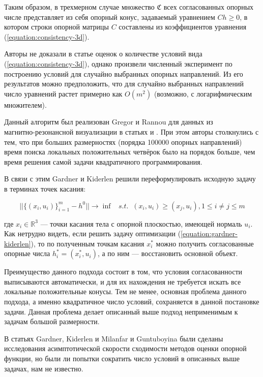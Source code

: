 \documentclass[a4paper, 10pt]{article}
\theoremstyle{definition}
\theoremstyle{plain}
\theoremstyle{plain}
\begin{document}
Таким образом, в трехмерном случае множество $\mathfrak{C}$ всех согласованных
опорных числе представляет из себя опорный конус, задаваемый уравнением
$C h \geq 0$, в котором строки опорной матрицы $C$ составлены из коэффициентов
уравнения (\ref{equation:consistency-3d}).

Авторы не доказали в статье оценок о количестве условий вида
(\ref{equation:consistency-3d}), однако произвели численный эксперимент по
построению условий для случайно выбранных опорных направлений. Из его
результатов можно предположить, что для случайно выбранных направлений число
уравнений растет примерно как $O(m^{2})$ (возможно, с логарифмическим
множителем).

Данный алгоритм был реализован Gregor и Rannou для данных из \\
магнитно-резонансной визуализации в статьях \cite{GregorRannou2001} и
\cite{GregorRannou2002}. При этом авторы столкнулись с тем, что при больших
размерностях (порядка 100000 опорных направлений) время поиска локальных
положительных четвёрок было на порядок больше, чем время решения самой задачи
квадратичного программирования.

В связи с этим Gardner и Kiderlen \cite{GardnerKiderlen} решили
переформулировать исходную задачу в терминах точек касания:

\begin{equation}
\label{equation:gardner-kiderlen}
 ||\{(x_{i}, u_{i})\}_{i = 1}^{m} - h^{0}|| \to \inf \;\;\; s. t. \;\;
 (x_{i}, u_{i}) \geq (x_{j}, u_{i}), 1 \leq i \neq j \leq m
\end{equation}

где $x_{i} \in \mathbb{R}^{3}$ --- точки касания тела с опорной плоскостью,
имеющей нормаль $u_{i}$. Как нетрудно видеть, если решить задачу оптимизации
(\ref{equation:gardner-kiderlen}), то по полученным точкам касания $x^{*}_{i}$
можно получить согласованные опорные числа $h^{*}_{i} = (x^{*}_{i}, u_{i})$, а
по ним --- восстановить основной объект.

Преимущество данного подхода состоит в том, что условия согласованности
выписываются автоматически, и для их нахождения не требуется искать все
локальные положительные конусы. Тем не менее, основная проблема данного подхода,
а именно квадратичное число условий, сохраняется в данной постановке задачи.
Данная проблема делает описанный выше подход неприменимым к задачам большой
размерности.

В статьях Gardner, Kiderlen и Milanfar \cite{GardnerKiderlenMilanfar} и
Guntuboyina \cite{Guntuboyina} были сделаны исследования асимптотической
скорости сходимости методов оценки опорной функции, но были ли попытки сократить
число условий в описанных выше задачах, нам не известно.
\end{document}
